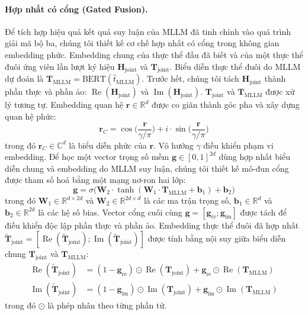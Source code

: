 \documentclass[10pt,twocolumn,a4paper]{article}
\newcommand{\Hj}{\mathbf{H}_{\mathrm{joint}}}
\newcommand{\Tj}{\mathbf{T}_{\mathrm{joint}}}
\newcommand{\Tm}{\mathbf{T}_{\mathrm{MLLM}}}
\renewcommand{\Re}{\operatorname{Re}}
\renewcommand{\Im}{\operatorname{Im}}
\begin{document}
\paragraph{Hợp nhất có cổng (Gated Fusion).}
Để tích hợp hiệu quả kết quả suy luận của MLLM đã tinh chỉnh vào quá trình giải mã bộ ba, chúng tôi thiết kế cơ chế hợp nhất có cổng trong không gian embedding phức. Embedding chung của thực thể đầu đã biết và của một thực thể đuôi ứng viên lần lượt ký hiệu $\Hj$ và $\Tj$. Biểu diễn thực thể đuôi do MLLM dự đoán là $\Tm = \mathrm{BERT}(\hat{t}_{\mathrm{MLLM}})$. Trước hết, chúng tôi tách $\Hj$ thành phần thực và phần ảo: $\Re(\Hj)$ và $\Im(\Hj)$. $\Tj$ và $\Tm$ được xử lý tương tự. Embedding quan hệ $\mathbf{r} \in \mathbb{R}^d$ được co giãn thành góc pha và xây dựng quan hệ phức:
\begin{equation}
\mathbf{r}_C = \cos\!\Big(\frac{\mathbf{r}}{\gamma/\pi}\Big) + i\cdot\sin\!\Big(\frac{\mathbf{r}}{\gamma/\pi}\Big)
\label{eq:6}
\end{equation}
trong đó $\mathbf{r}_C \in \mathbb{C}^d$ là biểu diễn phức của $\mathbf{r}$. Vô hướng $\gamma$ điều khiển phạm vi embedding. Để học một vector trọng số mềm $\mathbf{g} \in [0,1]^{2d}$ dùng hợp nhất biểu diễn chung và embedding do MLLM suy luận, chúng tôi thiết kế mô-đun cổng được tham số hoá bằng một mạng nơ-ron hai lớp:
\begin{equation}
\mathbf{g} = \sigma\big(\mathbf{W}_2\cdot\tanh(\mathbf{W}_1\cdot\Tm + \mathbf{b}_1) + \mathbf{b}_2\big)
\label{eq:7}
\end{equation}
trong đó $\mathbf{W}_1 \in \mathbb{R}^{d\times 2d}$ và $\mathbf{W}_2 \in \mathbb{R}^{2d\times d}$ là các ma trận trọng số, $\mathbf{b}_1 \in \mathbb{R}^d$ và $\mathbf{b}_2 \in \mathbb{R}^{2d}$ là các hệ số bias. Vector cổng cuối cùng $\mathbf{g} = [\mathbf{g}_{\mathrm{re}}; \mathbf{g}_{\mathrm{im}}]$ được tách để điều khiển độc lập phần thực và phần ảo. Embedding thực thể đuôi đã hợp nhất $\tilde{\mathbf{T}}_{\mathrm{joint}} = [\Re(\tilde{\mathbf{T}}_{\mathrm{joint}}); \Im(\tilde{\mathbf{T}}_{\mathrm{joint}})]$ được tính bằng nội suy giữa biểu diễn chung $\Tj$ và $\Tm$:
\begin{align}
\Re(\tilde{\mathbf{T}}_{\mathrm{joint}}) &= (1 - \mathbf{g}_{\mathrm{re}}) \odot \Re(\Tj) + \mathbf{g}_{\mathrm{re}} \odot \Re(\Tm) \label{eq:8}\\
\Im(\tilde{\mathbf{T}}_{\mathrm{joint}}) &= (1 - \mathbf{g}_{\mathrm{im}}) \odot \Im(\Tj) + \mathbf{g}_{\mathrm{im}} \odot \Im(\Tm) \label{eq:9}
\end{align}
trong đó $\odot$ là phép nhân theo từng phần tử.
\end{document}
